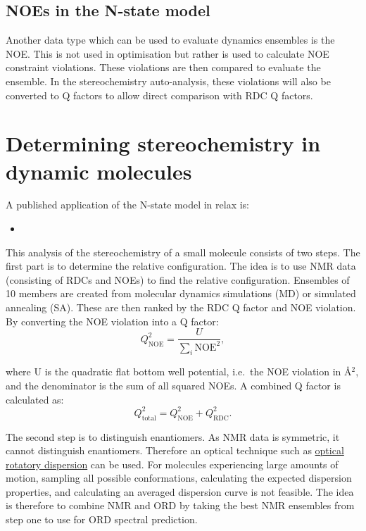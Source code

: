 \subsection{NOEs in the N-state model}

Another data type which can be used to evaluate dynamics ensembles is the NOE.
This is not used in optimisation but rather is used to calculate NOE constraint violations.
These violations are then compared to evaluate the ensemble.
In the stereochemistry auto-analysis, these violations will also be converted to Q factors to allow direct comparison with RDC Q factors.




\section{Determining stereochemistry in dynamic molecules}

A published application of the N-state model in relax is:
\begin{itemize}
  \item {}
\end{itemize}

This analysis of the stereochemistry of a small molecule consists of two steps.
The first part is to determine the relative configuration.
The idea is to use NMR data (consisting of RDCs and NOEs) to find the relative configuration.
Ensembles of 10 members are created from molecular dynamics simulations (MD) or simulated annealing (SA).
These are then ranked by the RDC Q factor and NOE violation.
By converting the NOE violation into a Q factor:
\begin{equation}
    Q_{\textrm{NOE}}^2 = \frac{U}{\sum_i \textrm{NOE}^2},
\end{equation}

where U is the quadratic flat bottom well potential, i.e.\ the NOE violation in \AA$^2$, and the denominator is the sum of all squared NOEs.
A combined Q factor is calculated as:
\begin{equation}
    Q_{\textrm{total}}^2 = Q_{\textrm{NOE}}^2 + Q_{\textrm{RDC}}^2.
\end{equation}

The second step is to distinguish enantiomers.
As NMR data is symmetric, it cannot distinguish enantiomers.
Therefore an optical technique such as \href{http://en.wikipedia.org/wiki/Optical\_rotatory\_dispersion}{optical rotatory dispersion} can be used.
For molecules experiencing large amounts of motion, sampling all possible conformations, calculating the expected dispersion properties, and calculating an averaged dispersion curve is not feasible.
The idea is therefore to combine NMR and ORD by taking the best NMR ensembles from step one to use for ORD spectral prediction.


